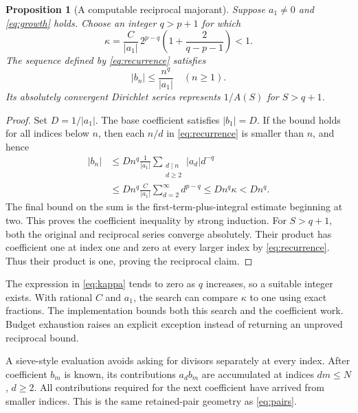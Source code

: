 \documentclass[11pt,letterpaper]{article}
\newtheorem{proposition}{Proposition}[section]
\begin{document}
\begin{proposition}[A computable reciprocal majorant]\label{prop:reciprocal}
Suppose $a_1\ne0$ and \eqref{eq:growth} holds. Choose an integer $q>p+1$ for which
\begin{equation}\label{eq:kappa}
 \kappa=\frac C{|a_1|}\,2^{p-q}
 \left(1+\frac2{q-p-1}\right)<1.
\end{equation}
The sequence defined by \eqref{eq:recurrence} satisfies
\begin{equation}
 |b_n|\leq\frac{n^q}{|a_1|}\quad(n\geq1).
\end{equation}
Its absolutely convergent Dirichlet series represents $1/A(S)$ for $S>q+1$.
\end{proposition}
\begin{proof}
Set $D=1/|a_1|$. The base coefficient satisfies $|b_1|=D$. If the bound holds
for all indices below $n$, then each $n/d$ in \eqref{eq:recurrence} is smaller
than $n$, and hence
\begin{align*}
 |b_n|&\leq Dn^q\frac1{|a_1|}
       \sum_{\substack{d\mid n\\d\geq2}}|a_d|d^{-q}\\
 &\leq Dn^q\frac C{|a_1|}\sum_{d=2}^{\infty}d^{p-q}
 \leq Dn^q\kappa < Dn^q.
\end{align*}
The final bound on the sum is the first-term-plus-integral estimate beginning
at two. This proves the coefficient inequality by strong induction. For
$S>q+1$, both the original and reciprocal series converge absolutely. Their
product has coefficient one at index one and zero at every larger index by
\eqref{eq:recurrence}. Thus their product is one, proving the reciprocal claim.
\end{proof}

The expression in \eqref{eq:kappa} tends to zero as $q$ increases, so a suitable
integer exists. With rational $C$ and $a_1$, the search can compare $\kappa$ to
one using exact fractions. The implementation bounds both this search and the
coefficient work. Budget exhaustion raises an explicit exception instead of
returning an unproved reciprocal bound.

A sieve-style evaluation avoids asking for divisors separately at every index.
After coefficient $b_m$ is known, its contributions $a_d b_m$ are accumulated
at indices $dm\leq N$, $d\geq2$. All contributions required for the next
coefficient have arrived from smaller indices. This is the same retained-pair
geometry as \eqref{eq:pairs}.
\end{document}
